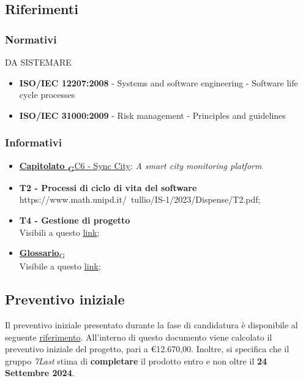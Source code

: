 \subsection{Riferimenti}
    \subsubsection{Normativi}DA SISTEMARE
        \begin{itemize}
            \item \textbf{ISO/IEC 12207:2008} - Systems and software engineering - Software life cycle processes
            \item \textbf{ISO/IEC 31000:2009} - Risk management - Principles and guidelines
        \end{itemize}
    \subsubsection{Informativi}
        \begin{itemize}
            \item \href{https://7last.github.io/docs/rtb/documentazione-interna/glossario#capitolato}{\textbf{Capitolato \textsubscript{G}}C6 - Sync City}: \textit{A smart city monitoring platform}
            \item \textbf{T2 - Processi di ciclo di vita del software}\\ https://www.math.unipd.it/~tullio/IS-1/2023/Dispense/T2.pdf;
            \item \textbf{T4 - Gestione di progetto}\\ Visibili a questo \uline{\href{https://www.math.unipd.it/~tullio/IS-1/2023/Dispense/T4.pdf}{link}};
            \item \href{https://7last.github.io/docs/rtb/documentazione-interna/glossario\#glossario}{\textbf{Glossario}\textsubscript{G}}\\ Visibile a questo \uline{\href{https://7last.github.io/docs/rtb/documentazione-interna/glossario}{link}};
        \end{itemize}
\subsection{Preventivo iniziale}
Il preventivo iniziale presentato durante la fase di candidatura è disponibile al seguente \uline{\href{https://github.com/7Last/docs/blob/main/1_candidatura/preventivo_costi_assunzione_impegni_v2.0.pdf}{riferimento}}. All'interno di questo documento viene calcolato il preventivo iniziale del progetto, pari a €12.670,00. Inoltre, si specifica che il gruppo \textit{7Last} stima di \textbf{completare} il prodotto entro e non oltre il \textbf{24 Settembre 2024}.